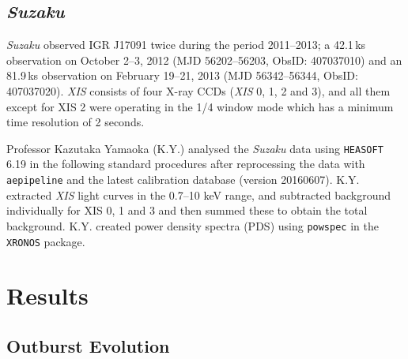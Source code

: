 \subsection{\textit{Suzaku}}

\par \indexsuzaku\textit{Suzaku} observed IGR J17091 twice during the period 2011--2013; a 42.1\,ks observation on October 2--3, 2012 (MJD 56202--56203, ObsID: 407037010) and an 81.9\,ks observation on February 19--21, 2013 (MJD 56342--56344, ObsID: 407037020). \indexxis\textit{XIS} consists of four X-ray CCDs (\textit{XIS} 0, 1, 2 and 3), and all them except for XIS 2 were operating in the 1/4 window mode which has a minimum time resolution of 2 seconds.
\par Professor Kazutaka Yamaoka (\textsf{K.Y.}) analysed the \textit{Suzaku} data using \texttt{HEASOFT} 6.19 in the following standard procedures after reprocessing the data with \texttt{aepipeline} and the latest calibration database (version 20160607).  \textsf{K.Y.} extracted \textit{XIS} light curves in the 0.7--10 keV range, and subtracted background individually for XIS 0, 1 and 3 and then summed these to obtain the total background.  \textsf{K.Y.} created power density spectra (PDS) using {\tt powspec} in the {\tt XRONOS} package.

\section{Results}
\label{sec:results}

\subsection{Outburst Evolution}

\label{sec:igrobevo}

